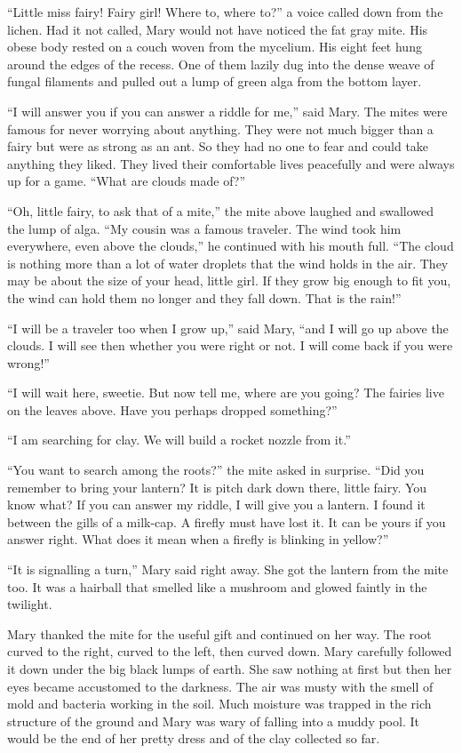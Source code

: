 \documentclass[10pt, draft]{memoir}
\begin{document}
``Little miss fairy! Fairy girl! Where to, where to?'' a voice called down from the lichen. Had it not called, Mary would not have noticed the fat gray mite. His obese body rested on a couch woven from the mycelium. His eight feet hung around the edges of the recess. One of them lazily dug into the dense weave of fungal filaments and pulled out a lump of green alga from the bottom layer.

``I will answer you if you can answer a riddle for me,'' said Mary. The mites were famous for never worrying about anything. They were not much bigger than a fairy but were as strong as an ant. So they had no one to fear and could take anything they liked. They lived their comfortable lives peacefully and were always up for a game. ``What are clouds made of?''

``Oh, little fairy, to ask that of a mite,'' the mite above laughed and swallowed the lump of alga. ``My cousin was a famous traveler. The wind took him everywhere, even above the clouds,'' he continued with his mouth full. ``The cloud is nothing more than a lot of water droplets that the wind holds in the air. They may be about the size of your head, little girl. If they grow big enough to fit you, the wind can hold them no longer and they fall down. That is the rain!”

``I will be a traveler too when I grow up,'' said Mary, ``and I will go up above the clouds. I will see then whether you were right or not. I will come back if you were wrong!''

``I will wait here, sweetie. But now tell me, where are you going? The fairies live on the leaves above. Have you perhaps dropped something?''

``I am searching for clay. We will build a rocket nozzle from it.''

``You want to search among the roots?'' the mite asked in surprise. ``Did you remember to bring your lantern? It is pitch dark down there, little fairy. You know what? If you can answer my riddle, I will give you a lantern. I found it between the gills of a milk-cap. A firefly must have lost it. It can be yours if you answer right. What does it mean when a firefly is blinking in yellow?''

``It is signalling a turn,'' Mary said right away. She got the lantern from the mite too. It was a hairball that smelled like a mushroom and glowed faintly in the twilight.

Mary thanked the mite for the useful gift and continued on her way. The root curved to the right, curved to the left, then curved down. Mary carefully followed it down under the big black lumps of earth. She saw nothing at first but then her eyes became accustomed to the darkness. The air was musty with the smell of mold and bacteria working in the soil. Much moisture was trapped in the rich structure of the ground and Mary was wary of falling into a muddy pool. It would be the end of her pretty dress and of the clay collected so far.
\end{document}
